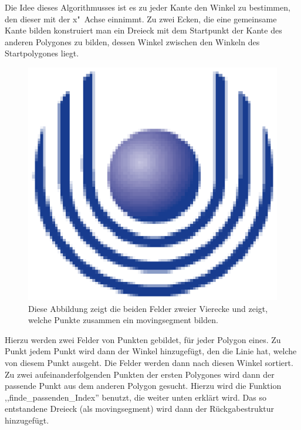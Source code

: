 Die Idee dieses Algorithmusses ist es zu jeder Kante den Winkel zu bestimmen, den dieser mit der x"~Achse einnimmt. Zu zwei Ecken, die eine gemeinsame Kante bilden konstruiert man ein Dreieck mit dem Startpunkt der Kante des anderen Polygones zu bilden, dessen Winkel zwischen den Winkeln des Startpolygones liegt.

\begin{figure}
	\centering
	\includegraphics{feu_logo2.eps}
	\caption[Tabellendarstellung des ,,rotating Pane'']{Diese Abbildung zeigt die beiden Felder zweier Vierecke und zeigt, welche Punkte zusammen ein movingsegment bilden.}
	\label{fig:RotatinPane}
\end{figure}


Hierzu werden zwei Felder von Punkten gebildet, für jeder Polygon eines. Zu Punkt jedem Punkt wird dann der Winkel hinzugefügt, den die Linie hat, welche von diesem Punkt ausgeht. Die Felder werden dann nach diesen Winkel sortiert. Zu zwei aufeinanderfolgenden Punkten der ersten Polygones wird dann der passende Punkt aus dem anderen Polygon gesucht. Hierzu wird die Funktion ,,finde\_passenden\_Index'' benutzt, die weiter unten erklärt wird. Das so entstandene Dreieck (als movingsegment) wird dann der Rückgabestruktur hinzugefügt.

